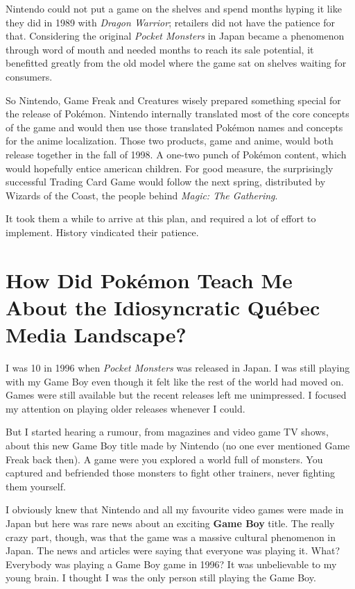 \documentclass{book}
\begin{document}
Nintendo could not put a game on the shelves and spend months hyping it like they did in 1989 with \emph{Dragon Warrior}; retailers did not have the patience for that. Considering the original \emph{Pocket Monsters} in Japan became a phenomenon through word of mouth and needed months to reach its sale potential, it benefitted greatly from the old model where the game sat on shelves waiting for consumers.\par
So Nintendo, Game Freak and Creatures wisely prepared something special for the release of Pokémon. Nintendo internally translated most of the core concepts of the game and would then use those translated Pokémon names and concepts for the anime localization. Those two products, game and anime, would both release together in the fall of 1998. A one-two punch of Pokémon content, which would hopefully entice american children. For good measure, the surprisingly successful Trading Card Game would follow the next spring, distributed by Wizards of the Coast, the people behind \emph{Magic: The Gathering}.\par
It took them a while to arrive at this plan, and required a lot of effort to implement. History vindicated their patience.\par
\FloatBarrier\section*{How Did Pokémon Teach Me About the Idiosyncratic Québec Media Landscape?}
I was 10 in 1996 when \emph{Pocket Monsters} was released in Japan. I was still playing with my Game Boy even though it felt like the rest of the world had moved on. Games were still available but the recent releases left me unimpressed. I focused my attention on playing older releases whenever I could.\par
But I started hearing a rumour, from magazines and video game TV shows, about this new Game Boy title made by Nintendo (no one ever mentioned Game Freak back then). A game were you explored a world full of monsters. You captured and befriended those monsters to fight other trainers, never fighting them yourself.\par
I obviously knew that Nintendo and all my favourite video games were made in Japan but here was rare news about an exciting \textbf{Game Boy} title. The really crazy part, though, was that the game was a massive cultural phenomenon in Japan. The news and articles were saying that everyone was playing it. What? Everybody was playing a Game Boy game in 1996? It was unbelievable to my young brain. I thought I was the only person still playing the Game Boy.\par
\end{document}

